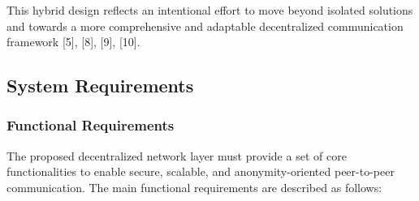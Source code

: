 \documentclass[12pt,a4paper]{article}
\begin{document}
This hybrid design reflects an intentional effort to move beyond isolated solutions and towards a more comprehensive and adaptable decentralized communication framework [5], [8], [9], [10].

\subsection{System Requirements}
\subsubsection{Functional Requirements}

The proposed decentralized network layer must provide a set of core functionalities to enable secure, scalable, and anonymity-oriented peer-to-peer communication. The main functional requirements are described as follows:
\end{document}
